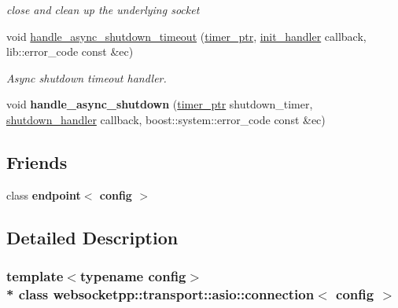 \begin{DoxyCompactItemize}
\begin{DoxyCompactList}\small\item\em close and clean up the underlying socket \end{DoxyCompactList}\item 
void \hyperlink{classwebsocketpp_1_1transport_1_1asio_1_1connection_a9386ad48e8b2137987205bc4e831edfb}{handle\+\_\+async\+\_\+shutdown\+\_\+timeout} (\hyperlink{classwebsocketpp_1_1transport_1_1asio_1_1connection_aa725ead0a0f3733f7f7e57076f194081}{timer\+\_\+ptr}, \hyperlink{namespacewebsocketpp_1_1transport_aeae75e675c1a334b3b33ab7120b480a5}{init\+\_\+handler} callback, lib\+::error\+\_\+code const \&ec)
\begin{DoxyCompactList}\small\item\em Async shutdown timeout handler. \end{DoxyCompactList}\item 
void {\bfseries handle\+\_\+async\+\_\+shutdown} (\hyperlink{classwebsocketpp_1_1transport_1_1asio_1_1connection_aa725ead0a0f3733f7f7e57076f194081}{timer\+\_\+ptr} shutdown\+\_\+timer, \hyperlink{namespacewebsocketpp_1_1transport_af39aff6fc4cb76f7df0d5322b734d156}{shutdown\+\_\+handler} callback, boost\+::system\+::error\+\_\+code const \&ec)\hypertarget{classwebsocketpp_1_1transport_1_1asio_1_1connection_a1fbedbbe3a41e438119f64548c4968b5}{}\label{classwebsocketpp_1_1transport_1_1asio_1_1connection_a1fbedbbe3a41e438119f64548c4968b5}

\end{DoxyCompactItemize}
\subsection*{Friends}
\begin{DoxyCompactItemize}
\item 
class {\bfseries endpoint$<$ config $>$}\hypertarget{classwebsocketpp_1_1transport_1_1asio_1_1connection_ad7f0fad4f6837f8f4e97cf905b3a231f}{}\label{classwebsocketpp_1_1transport_1_1asio_1_1connection_ad7f0fad4f6837f8f4e97cf905b3a231f}

\end{DoxyCompactItemize}


\subsection{Detailed Description}
\subsubsection*{template$<$typename config$>$\\*
class websocketpp\+::transport\+::asio\+::connection$<$ config $>$}

